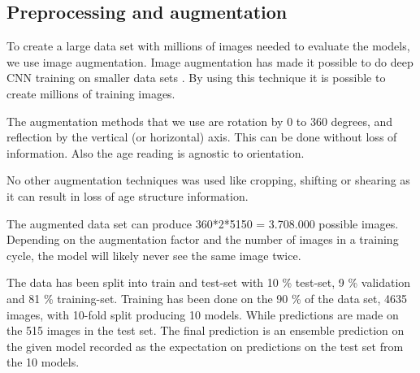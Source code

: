 \documentclass[10pt,letterpaper]{article}
\begin{document}
\subsection*{Preprocessing and augmentation}

To create a large data set with millions of images needed to evaluate the models, we use image augmentation. Image augmentation has made it possible to do deep CNN training on smaller data sets \citep{krizhevsky2012imagenet}. By using this technique it is possible to create millions of training images.

The augmentation methods that we use are rotation by 0 to 360 degrees, and reflection by the vertical (or horizontal) axis. This can be done without loss of information. Also the age reading is agnostic to orientation.

No other augmentation techniques was used like  cropping, shifting or shearing as it can result in loss of age structure information.

The augmented data set can produce 360*2*5150 = 3.708.000 possible images.
Depending on the augmentation factor and the number of images in a training cycle, the model will likely never see the same image twice.

The data has been split into train and test-set with 10 \% test-set, 9 \% validation
and 81 \% training-set. Training has been done on the 90 \% of the data set, 4635 images, with 10-fold split producing 10 models. While predictions are made on the 515 images in the test set. The final prediction is
an ensemble prediction on the given model recorded as the expectation on predictions on the test set from the 10 models. 
\end{document}
